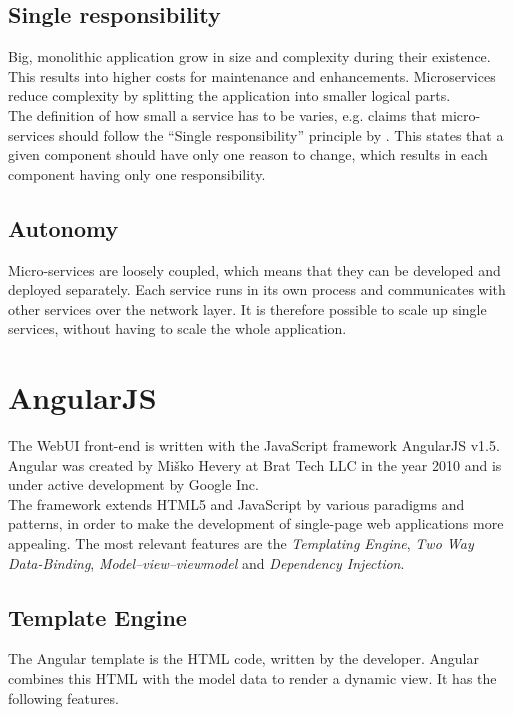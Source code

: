 \subsection{Single responsibility}
Big, monolithic application grow in size and complexity during their existence. This results into higher costs for maintenance and enhancements. Microservices reduce complexity by splitting the application into smaller logical parts.\\
The definition of how small a service has to be varies, \cite{newman2015building} e.g. claims that micro-services should follow the \enquote{Single responsibility} principle by \cite{martin2003agile}. This states that a given component should have only one reason to change, which results in each component having only one responsibility.


\subsection{Autonomy}
Micro-services are loosely coupled, which means that they can be developed and deployed separately. Each service runs in its own process and communicates with other services over the network layer. It is therefore possible to scale up single services, without having to scale the whole application.



\section{AngularJS}
\label{sec:angularjs}
The WebUI front-end is written with the JavaScript framework AngularJS v1.5. Angular was created by Miško Hevery at Brat Tech LLC in the year 2010 and is under active development by Google Inc. \\
The framework extends HTML5 and JavaScript by various paradigms and patterns, in order to make the development of single-page web applications more appealing. The most relevant features are the \textit{Templating Engine}, \textit{Two Way Data-Binding}, \textit{Model–view–viewmodel} and \textit{Dependency Injection}.


\subsection{Template Engine}
The Angular template is the HTML code, written by the developer. Angular combines this HTML with the model data to render a dynamic view. It has the following features.

